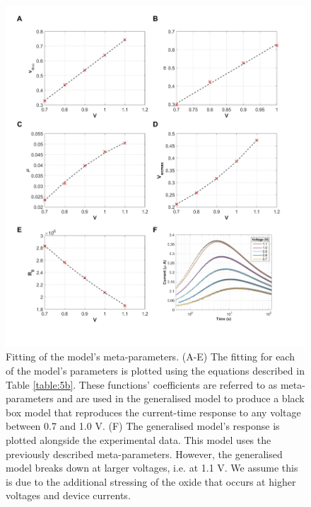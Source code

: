 \begin{figure}[htbp!] 
    \centering    
    \includegraphics[width=1\textwidth]{Chapter5/Figs/f.png}
    \caption[Fitting of the model's meta-parameters.]{Fitting of the model's meta-parameters. (A-E) The fitting for each of the model's parameters is plotted using the equations described in Table \ref{table:5b}. These functions' coefficients are referred to as meta-parameters and are used in the generalised model to produce a black box model that reproduces the current-time response to any voltage between 0.7 and 1.0 V. (F) The generalised model's response is plotted alongside the experimental data. This model uses the previously described meta-parameters. However, the generalised model breaks down at larger voltages, i.e. at 1.1 V. We assume this is due to the additional stressing of the oxide that occurs at higher voltages and device currents.}
    \label{fig:5f}
\end{figure}


